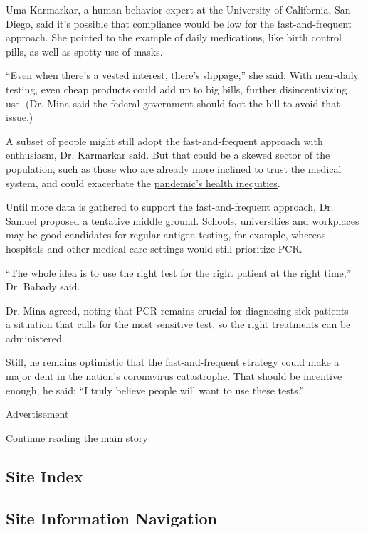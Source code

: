 Uma Karmarkar, a human behavior expert at the University of California,
San Diego, said it's possible that compliance would be low for the
fast-and-frequent approach. She pointed to the example of daily
medications, like birth control pills, as well as spotty use of masks.

``Even when there's a vested interest, there's slippage,'' she said.
With near-daily testing, even cheap products could add up to big bills,
further disincentivizing use. (Dr. Mina said the federal government
should foot the bill to avoid that issue.)

A subset of people might still adopt the fast-and-frequent approach with
enthusiasm, Dr. Karmarkar said. But that could be a skewed sector of the
population, such as those who are already more inclined to trust the
medical system, and could exacerbate the
\href{https://www.nytimes3xbfgragh.onion/interactive/2020/07/05/us/coronavirus-latinos-african-americans-cdc-data.html}{pandemic's
health inequities}.

Until more data is gathered to support the fast-and-frequent approach,
Dr. Samuel proposed a tentative middle ground. Schools,
\href{https://jamanetwork.com/journals/jamanetworkopen/fullarticle/2768923}{universities}
and workplaces may be good candidates for regular antigen testing, for
example, whereas hospitals and other medical care settings would still
prioritize PCR.

``The whole idea is to use the right test for the right patient at the
right time,'' Dr. Babady said.

Dr. Mina agreed, noting that PCR remains crucial for diagnosing sick
patients --- a situation that calls for the most sensitive test, so the
right treatments can be administered.

Still, he remains optimistic that the fast-and-frequent strategy could
make a major dent in the nation's coronavirus catastrophe. That should
be incentive enough, he said: ``I truly believe people will want to use
these tests.''

Advertisement

\protect\hyperlink{after-bottom}{Continue reading the main story}

\hypertarget{site-index}{%
\subsection{Site Index}\label{site-index}}

\hypertarget{site-information-navigation}{%
\subsection{Site Information
Navigation}\label{site-information-navigation}}

